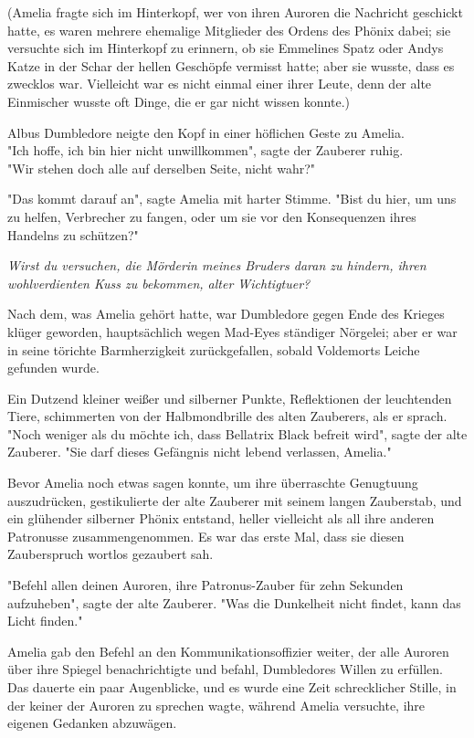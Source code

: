 {(Amelia fragte sich im Hinterkopf, wer von ihren Auroren die Nachricht geschickt hatte, es waren mehrere ehemalige Mitglieder des Ordens des Phönix dabei; sie versuchte sich im Hinterkopf zu erinnern, ob sie Emmelines Spatz oder Andys Katze in der Schar der hellen Geschöpfe vermisst hatte; aber sie wusste, dass es zwecklos war. Vielleicht war es nicht einmal einer ihrer Leute, denn der alte Einmischer wusste oft Dinge, die er gar nicht wissen konnte.)

Albus Dumbledore neigte den Kopf in einer höflichen Geste zu Amelia.\\ "Ich hoffe, ich bin hier nicht unwillkommen", sagte der Zauberer ruhig.\\ "Wir stehen doch alle auf derselben Seite, nicht wahr?"

"Das kommt darauf an", sagte Amelia mit harter Stimme. "Bist du hier, um uns zu helfen, Verbrecher zu fangen, oder um sie vor den Konsequenzen ihres Handelns zu schützen?"

\emph{Wirst du versuchen, die Mörderin meines Bruders daran zu hindern, ihren wohlverdienten Kuss zu bekommen, alter Wichtigtuer?}

Nach dem, was Amelia gehört hatte, war Dumbledore gegen Ende des Krieges klüger geworden, hauptsächlich wegen Mad-Eyes ständiger Nörgelei; aber er war in seine törichte Barmherzigkeit zurückgefallen, sobald Voldemorts Leiche gefunden wurde.

Ein Dutzend kleiner weißer und silberner Punkte, Reflektionen der leuchtenden Tiere, schimmerten von der Halbmondbrille des alten Zauberers, als er sprach.\\ "Noch weniger als du möchte ich, dass Bellatrix Black befreit wird", sagte der alte Zauberer. "Sie darf dieses Gefängnis nicht lebend verlassen, Amelia."

Bevor Amelia noch etwas sagen konnte, um ihre überraschte Genugtuung auszudrücken, gestikulierte der alte Zauberer mit seinem langen Zauberstab, und ein glühender silberner Phönix entstand, heller vielleicht als all ihre anderen Patronusse zusammengenommen. Es war das erste Mal, dass sie diesen Zauberspruch wortlos gezaubert sah.

"Befehl allen deinen Auroren, ihre Patronus-Zauber für zehn Sekunden aufzuheben", sagte der alte Zauberer. "Was die Dunkelheit nicht findet, kann das Licht finden."

Amelia gab den Befehl an den Kommunikationsoffizier weiter, der alle Auroren über ihre Spiegel benachrichtigte und befahl, Dumbledores Willen zu erfüllen. Das dauerte ein paar Augenblicke, und es wurde eine Zeit schrecklicher Stille, in der keiner der Auroren zu sprechen wagte, während Amelia versuchte, ihre eigenen Gedanken abzuwägen.

}
